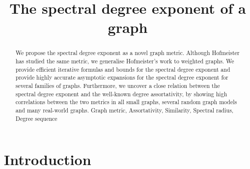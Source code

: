 \documentclass{comnet}%
\begin{document}
\title{The spectral degree exponent of a graph}


\author{%
\address{Faculty of Electrical Engineering, Mathematics and Computer Science, Delft University of Technology, P.O. Box 5031, 2600 GA Delft, The Netherlands}
}

\maketitle

\begin{abstract}
{We propose the spectral degree exponent as a novel graph metric. Although Hofmeister \cite{HofmeisterThesis} has studied the same metric, we generalise Hofmeister's work to weighted graphs. We provide efficient iterative formulas and bounds for the spectral degree exponent and provide highly accurate asymptotic expansions for the spectral degree exponent for several families of graphs. Furthermore, we uncover a close relation between the spectral degree exponent and the well-known degree assortativity, by showing high correlations between the two metrics in all small graphs, several random graph models and many real-world graphs.}
{Graph metric, Assortativity, Similarity, Spectral radius, Degree sequence}
\end{abstract}




\section{Introduction}\label{sec_introduction}
\end{document}
